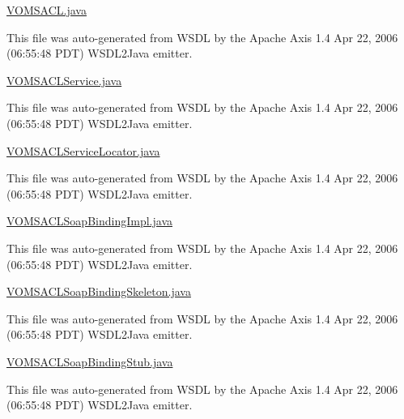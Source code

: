 \hyperlink{VOMSACL_8java}{VOMSACL.java}

This file was auto-\/generated from WSDL by the Apache Axis 1.4 Apr 22, 2006 (06:55:48 PDT) WSDL2Java emitter.

\hyperlink{VOMSACLService_8java}{VOMSACLService.java}

This file was auto-\/generated from WSDL by the Apache Axis 1.4 Apr 22, 2006 (06:55:48 PDT) WSDL2Java emitter.

\hyperlink{VOMSACLServiceLocator_8java}{VOMSACLServiceLocator.java}

This file was auto-\/generated from WSDL by the Apache Axis 1.4 Apr 22, 2006 (06:55:48 PDT) WSDL2Java emitter.

\hyperlink{VOMSACLSoapBindingImpl_8java}{VOMSACLSoapBindingImpl.java}

This file was auto-\/generated from WSDL by the Apache Axis 1.4 Apr 22, 2006 (06:55:48 PDT) WSDL2Java emitter.

\hyperlink{VOMSACLSoapBindingSkeleton_8java}{VOMSACLSoapBindingSkeleton.java}

This file was auto-\/generated from WSDL by the Apache Axis 1.4 Apr 22, 2006 (06:55:48 PDT) WSDL2Java emitter.

\hyperlink{VOMSACLSoapBindingStub_8java}{VOMSACLSoapBindingStub.java}

This file was auto-\/generated from WSDL by the Apache Axis 1.4 Apr 22, 2006 (06:55:48 PDT) WSDL2Java emitter. 